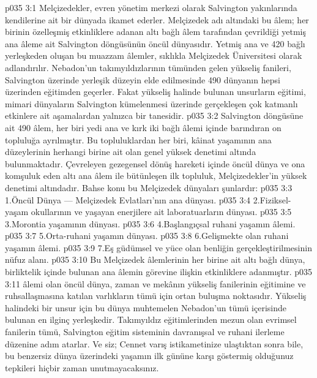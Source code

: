 \vs p035 3:1 Melçizedekler, evren yönetim merkezi olarak Salvington yakınlarında kendilerine ait bir dünyada ikamet ederler. Melçizedek adı altındaki bu âlem; her birinin özelleşmiş etkinliklere adanan altı bağlı âlem tarafından çevrildiği yetmiş ana âleme ait Salvington döngüsünün öncül dünyasıdır. Yetmiş ana ve 420 bağlı yerleşkeden oluşan bu muazzam âlemler, sıklıkla Melçizedek Üniversitesi olarak adlandırılır. Nebadon’un takımyıldızlarının tümünden gelen yükseliş fanileri, Salvington üzerinde yerleşik düzeyin elde edilmesinde 490 dünyanın hepsi üzerinden eğitimden geçerler. Fakat yükseliş halinde bulunan unsurların eğitimi, mimari dünyaların Salvington kümelenmesi üzerinde gerçekleşen çok katmanlı etkinlere ait aşamalardan yalnızca bir tanesidir.
\vs p035 3:2 Salvington döngüsüne ait 490 âlem, her biri yedi ana ve kırk iki bağlı âlemi içinde barındıran on topluluğa ayrılmıştır. Bu topluluklardan her biri, kâinat yaşamının ana düzeylerinin herhangi birine ait olan genel yüksek denetimi altında bulunmaktadır. Çevreleyen gezegensel dönüş hareketi içinde öncül dünya ve ona komşuluk eden altı ana âlem ile bütünleşen ilk topluluk, Melçizedekler’in yüksek denetimi altındadır. Bahse konu bu Melçizedek dünyaları şunlardır:
\vs p035 3:3 1.\bibnobreakspace Öncül Dünya --- Melçizedek Evlatları’nın ana dünyası.
\vs p035 3:4 2.\bibnobreakspace Fiziksel\hyp{}yaşam okullarının ve yaşayan enerjilere ait laboratuarların dünyası.
\vs p035 3:5 3.\bibnobreakspace Morontia yaşamının dünyası.
\vs p035 3:6 4.\bibnobreakspace Başlangıçsal ruhani yaşamın âlemi.
\vs p035 3:7 5.\bibnobreakspace Orta\hyp{}ruhani yaşamın dünyası.
\vs p035 3:8 6.\bibnobreakspace Gelişmekte olan ruhani yaşamın âlemi.
\vs p035 3:9 7.\bibnobreakspace Eş güdümsel ve yüce olan benliğin gerçekleştirilmesinin nüfuz alanı.
\vs p035 3:10 Bu Melçizedek âlemlerinin her birine ait altı bağlı dünya, birliktelik içinde bulunan ana âlemin görevine ilişkin etkinliklere adanmıştır.
\vs p035 3:11  âlemi olan öncül dünya, zaman ve mekânın yükseliş fanilerinin eğitimine ve ruhsallaşmasına katılan varlıkların tümü için ortan buluşma noktasıdır. Yükseliş halindeki bir unsur için bu dünya muhtemelen Nebadon’un tümü içerisinde bulunan en ilginç yerleşkedir. Takımyıldız eğitimlerinden mezun olan evrimsel fanilerin tümü, Salvington eğitim sisteminin davranışsal ve ruhani ilerleme düzenine adım atarlar. Ve siz; Cennet varış istikametinize ulaştıktan sonra bile, bu benzersiz dünya üzerindeki yaşamın ilk gününe karşı göstermiş olduğunuz tepkileri hiçbir zaman unutmayacaksınız.
